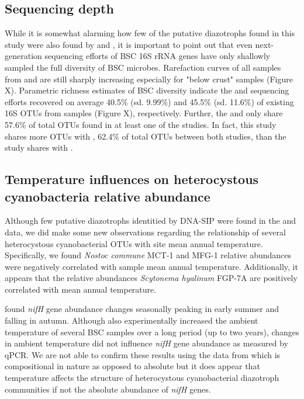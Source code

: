 \subsection{Sequencing depth}
While it is somewhat alarming how few of the putative diazotrophs found in this study were also found by \citet{Garcia_Pichel_2013} and \citet{Steven_2013}, it is important to point out that even next-generation sequencing efforts of BSC 16S rRNA genes have only shallowly sampled the full diversity of BSC microbes. Rarefaction curves of all samples from \citet{Steven_2013} and \citet{Garcia_Pichel_2013} are still sharply increasing especially for "below crust" samples (Figure X). Parametric richness estimates of BSC diversity indicate the \citet{Steven_2013} and \citet{Garcia_Pichel_2013} sequencing efforts recovered on average 40.5\% (sd. 9.99\%) and 45.5\% (sd. 11.6\%) of existing 16S OTUs from samples (Figure X), respectively. Further, the \citet{Steven_2013} and \citet{Garcia_Pichel_2013} only share 57.6\% of total OTUs found in at least one of the studies. In fact, this study shares more OTUs with \citet{Steven_2013}, 62.4\% of total OTUs between both studies, than the \citet{Steven_2013} study shares with \citet{Garcia_Pichel_2013}. 

\subsection{Temperature influences on heterocystous cyanobacteria relative abundance}
Although few putative diazotrophs identitied by DNA-SIP were found in the \citet{Garcia_Pichel_2013} and \citet{Steven_2013} data, we did make some new observations regarding the relationship of several heterocystous cyanobacterial OTUs with site mean annual temperature. Specifically, we found \textit{Nostoc commune} MCT-1 and MFG-1 relative abundances were negatively correlated with sample mean annual temperature. Additionally, it appears that the relative abundances \textit{Scytonema hyalinum} FGP-7A  are positively correlated with mean annual temperature.

\citet{Yeager_2012} found \textit{nifH} gene abundance changes seasonally peaking in early summer and falling in autumn. Although \citet{Yeager_2012} also experimentally increased the ambient temperature of several BSC samples over a long period (up to two years), changes in ambient temperature did not influence \textit{nifH} gene abundance as measured by qPCR. We are not able to confirm these results using the data from \citet{Garcia_Pichel_2013} which is compositional in nature as opposed to absolute but it does appear that temperature affects the structure of heterocystous cyanobacterial diazotroph communities if not the absolute abundance of \textit{nifH} genes. 

